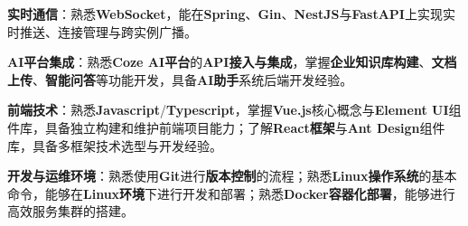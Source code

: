\item \textbf{实时通信}：熟悉\textbf{WebSocket}，能在\textbf{Spring}、\textbf{Gin}、\textbf{NestJS}与\textbf{FastAPI}上实现实时推送、连接管理与跨实例广播。
\item \textbf{AI平台集成}：熟悉\textbf{Coze AI平台}的\textbf{API接入与集成}，掌握\textbf{企业知识库构建}、\textbf{文档上传}、\textbf{智能问答}等功能开发，具备\textbf{AI助手}系统后端开发经验。
\item \textbf{前端技术}：熟悉\textbf{Javascript}/\textbf{Typescript}，掌握\textbf{Vue.js}核心概念与\textbf{Element UI}组件库，具备独立构建和维护前端项目能力；了解\textbf{React框架}与\textbf{Ant Design}组件库，具备多框架技术选型与开发经验。
\item \textbf{开发与运维环境}：熟悉使用\textbf{Git}进行\textbf{版本控制}的流程；熟悉\textbf{Linux操作系统}的基本命令，能够在\textbf{Linux环境}下进行开发和部署；熟悉\textbf{Docker容器化部署}，能够进行高效服务集群的搭建。